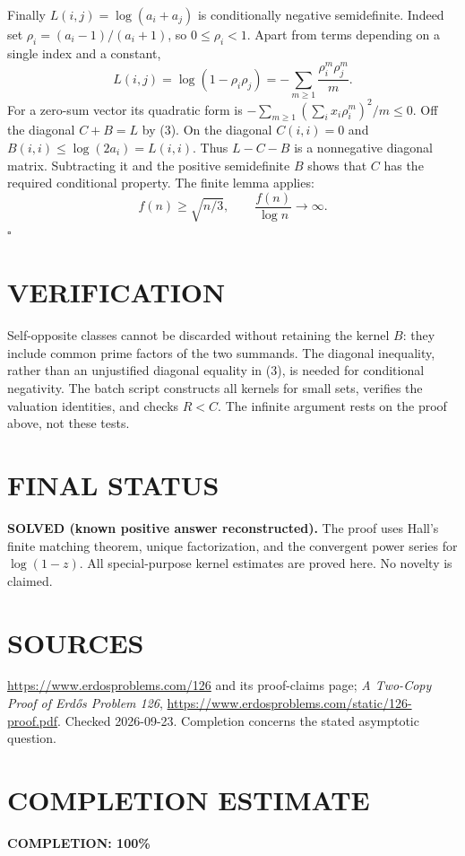 Finally $L(i,j)=\log(a_i+a_j)$ is conditionally negative semidefinite.
Indeed set $\rho_i=(a_i-1)/(a_i+1)$, so $0\le\rho_i<1$. Apart from
terms depending on a single index and a constant,
\[
 L(i,j)=\log(1-\rho_i\rho_j)
       =-\sum_{m\ge1}\frac{\rho_i^m\rho_j^m}{m}.
\]
For a zero-sum vector its quadratic form is
$-\sum_{m\ge1}(\sum_i x_i\rho_i^m)^2/m\le0$.
Off the diagonal $C+B=L$ by (3). On the diagonal $C(i,i)=0$ and
$B(i,i)\le\log(2a_i)=L(i,i)$. Thus $L-C-B$ is a nonnegative diagonal
matrix. Subtracting it and the positive semidefinite $B$ shows that $C$
has the required conditional property. The finite lemma applies:
\[
 f(n)\ge\sqrt{n/3},\qquad
 \frac{f(n)}{\log n}\longrightarrow\infty.
\]
\hfill$\square$

\section{VERIFICATION}
Self-opposite classes cannot be discarded without retaining the kernel
$B$: they include common prime factors of the two summands. The diagonal
inequality, rather than an unjustified diagonal equality in (3), is
needed for conditional negativity. The batch script constructs all
kernels for small sets, verifies the valuation identities, and checks
$R<C$. The infinite argument rests on the proof above, not these tests.

\section{FINAL STATUS}
\textbf{SOLVED (known positive answer reconstructed).}
The proof uses Hall's finite matching theorem, unique factorization,
and the convergent power series for $\log(1-z)$. All special-purpose
kernel estimates are proved here. No novelty is claimed.

\section{SOURCES}
\url{https://www.erdosproblems.com/126} and its proof-claims page;
\emph{A Two-Copy Proof of Erd\H{o}s Problem 126},
\url{https://www.erdosproblems.com/static/126-proof.pdf}.
Checked 2026-09-23. Completion concerns the stated asymptotic question.

\section{COMPLETION ESTIMATE}
\textbf{COMPLETION: 100\%}

